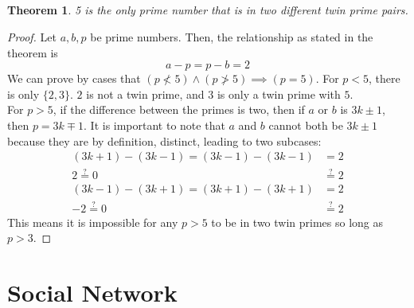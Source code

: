 \documentclass{article}
\newtheorem{theorem}{Theorem}
\begin{document}
\subsection{}

\begin{theorem}
    5 is the only prime number that is in two different twin prime pairs.
\end{theorem}
\begin{proof}
    Let \(a, b, p\) be prime numbers.
    Then, the relationship as stated in the theorem is
    \begin{equation}
        a - p = p - b = 2
    \end{equation}
    We can prove by cases that \((p \nless 5) \land (p \ngtr 5) \implies (p = 5)\).
    For \(p < 5\), there is only \(\{2, 3\}\).
    \(2\) is not a twin prime, and \(3\) is only a twin prime with \(5\). \\
    For \(p > 5\), if the difference between the primes is two, then if \(a\) or \(b\) is \(3k \pm 1\), then \(p = 3k \mp 1\).
    It is important to note that \(a\) and \(b\) cannot both be \(3k \pm 1\) because they are by definition, distinct, leading to two subcases:
    \begin{align}
        (3k + 1) - (3k - 1) = (3k - 1) - (3k - 1) &= 2 \\
        2 \overset{?}{=} 0 &\overset{?}{=} 2 \\
        (3k - 1) - (3k + 1) = (3k + 1) - (3k + 1) &= 2 \\
        -2 \overset{?}{=} 0 &\overset{?}{=} 2
    \end{align}
    This means it is impossible for any \(p > 5\) to be in two twin primes so long as \(p > 3\).
\end{proof}

\section{Social Network}
\end{document}
